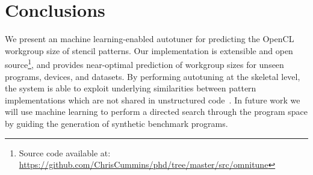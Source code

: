 \documentclass[times, 10pt,twocolumn]{article}
\begin{document}
\section{Conclusions}

We present an machine learning-enabled autotuner for predicting the
OpenCL workgroup size of stencil patterns. Our implementation is
extensible and open source\footnote{Source code available at:
  \url{https://github.com/ChrisCummins/phd/tree/master/src/omnitune}},
and provides near-optimal prediction of workgroup sizes for unseen
programs, devices, and datasets. By performing autotuning at the
skeletal level, the system is able to exploit underlying similarities
between pattern implementations which are not shared in unstructured
code~\cite{Hu2015}. In future work we will use machine learning to
perform a directed search through the program space by guiding the
generation of synthetic benchmark programs.

\printbibliography
\end{document}
